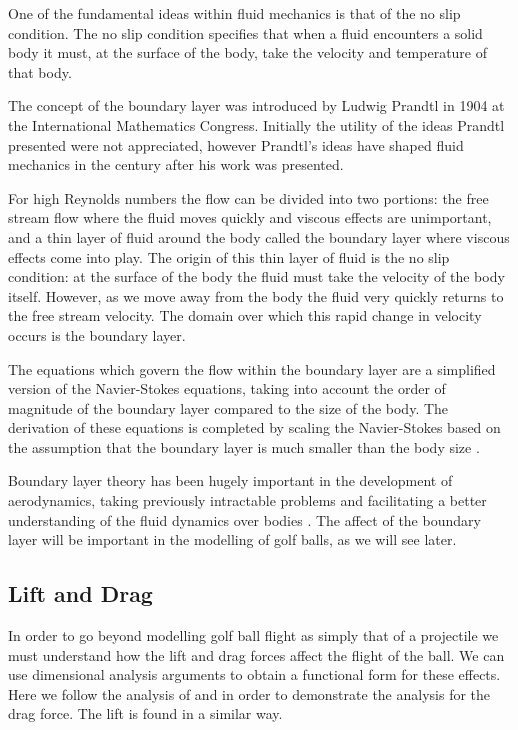 One of the fundamental ideas within fluid mechanics is that of the no slip condition. The no slip 
condition specifies that when a fluid encounters a solid body it must, at the surface of the body,
take the velocity and temperature of that body. 

The concept of the boundary layer was introduced by Ludwig Prandtl in 1904 at the International
Mathematics Congress. Initially the utility of the ideas Prandtl presented were not appreciated, however
Prandtl's ideas have shaped fluid mechanics in the century after his work was presented.

For high Reynolds numbers the flow can be divided into two portions: the free stream flow where the
fluid moves quickly and viscous effects are unimportant, and a thin layer of fluid around the body 
called the boundary layer where viscous effects come into play. The origin of this thin layer of fluid
is the no slip condition: at the surface of the body the fluid must take the velocity of the body itself.
However, as we move away from the body the fluid very quickly returns to the free stream velocity. The
domain over which this rapid change in velocity occurs is the boundary layer.

The equations which govern the flow within the boundary layer are a simplified version of the
Navier-Stokes equations, taking into account the order of magnitude of the boundary layer compared to
the size of the body. The derivation of these equations is completed by scaling the Navier-Stokes 
based on the assumption that the boundary layer is much smaller than the body size \citet{anderson}.

Boundary layer theory has been hugely important in the development of aerodynamics, taking previously
intractable problems and facilitating a better understanding of the fluid dynamics over bodies 
\citet{anderson}. The affect of the boundary layer will be important in the modelling of golf balls,
as we will see later.

\subsection{Lift and Drag} \label{sec:drag}

In order to go beyond modelling golf ball flight as simply that of a projectile we must understand 
how the lift and drag forces affect the flight of the ball. We can use dimensional analysis arguments
to obtain a functional form for these effects. Here we follow the analysis of 
\citet{0143-0807-31-4-019} and \citet{anderson} in order to demonstrate the analysis for the drag force. 
The lift is found in a similar way.

